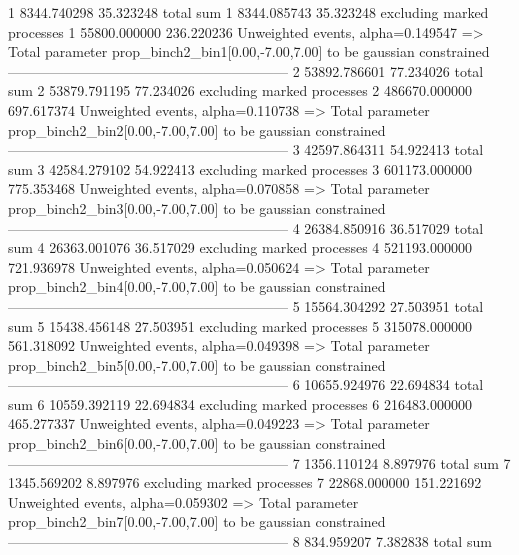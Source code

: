 1          8344.740298     35.323248       total sum                     
1          8344.085743     35.323248       excluding marked processes    
1          55800.000000    236.220236      Unweighted events, alpha=0.149547
  => Total parameter prop_binch2_bin1[0.00,-7.00,7.00] to be gaussian constrained
------------------------------------------------------------
2          53892.786601    77.234026       total sum                     
2          53879.791195    77.234026       excluding marked processes    
2          486670.000000   697.617374      Unweighted events, alpha=0.110738
  => Total parameter prop_binch2_bin2[0.00,-7.00,7.00] to be gaussian constrained
------------------------------------------------------------
3          42597.864311    54.922413       total sum                     
3          42584.279102    54.922413       excluding marked processes    
3          601173.000000   775.353468      Unweighted events, alpha=0.070858
  => Total parameter prop_binch2_bin3[0.00,-7.00,7.00] to be gaussian constrained
------------------------------------------------------------
4          26384.850916    36.517029       total sum                     
4          26363.001076    36.517029       excluding marked processes    
4          521193.000000   721.936978      Unweighted events, alpha=0.050624
  => Total parameter prop_binch2_bin4[0.00,-7.00,7.00] to be gaussian constrained
------------------------------------------------------------
5          15564.304292    27.503951       total sum                     
5          15438.456148    27.503951       excluding marked processes    
5          315078.000000   561.318092      Unweighted events, alpha=0.049398
  => Total parameter prop_binch2_bin5[0.00,-7.00,7.00] to be gaussian constrained
------------------------------------------------------------
6          10655.924976    22.694834       total sum                     
6          10559.392119    22.694834       excluding marked processes    
6          216483.000000   465.277337      Unweighted events, alpha=0.049223
  => Total parameter prop_binch2_bin6[0.00,-7.00,7.00] to be gaussian constrained
------------------------------------------------------------
7          1356.110124     8.897976        total sum                     
7          1345.569202     8.897976        excluding marked processes    
7          22868.000000    151.221692      Unweighted events, alpha=0.059302
  => Total parameter prop_binch2_bin7[0.00,-7.00,7.00] to be gaussian constrained
------------------------------------------------------------
8          834.959207      7.382838        total sum                     
